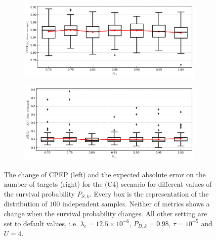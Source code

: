 \begin{figure}
    \centering
    \begin{subfigure}[]{0.48\linewidth}
        \centering
        \includegraphics[width=\linewidth]{figures/c4-ps-cpep.png}
    \end{subfigure}
    \hfill
    \begin{subfigure}[]{0.48\linewidth}
        \centering
        \includegraphics[width=\linewidth]{figures/c4-ps-eae.png}
    \end{subfigure}
  \caption[(C4). Change of performance depending on the survival probability.]{The change of CPEP (left) and the expected absolute error on the number of targets (right) for the (C4) scenario for different values of the survival probability $P_{S,k}$. Every box is the representation of the distribution of $100$ independent samples. Neither of metrics shows a change when the survival probability changes. All other setting are set to default values, i.e. $\lambda_{c} = 12.5 \times 10^{-6}$, $P_{D,k} = 0.98$, $\tau = 10^{-5}$ and $U = 4$.}
  \label{fig:c4-ps}
\end{figure}


